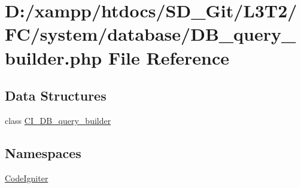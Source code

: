 \hypertarget{system_2database_2_d_b__query__builder_8php}{}\section{D\+:/xampp/htdocs/\+S\+D\+\_\+\+Git/\+L3\+T2/\+F\+C/system/database/\+D\+B\+\_\+query\+\_\+builder.php File Reference}
\label{system_2database_2_d_b__query__builder_8php}
\subsection*{Data Structures}
\begin{DoxyCompactItemize}
\item 
class \hyperlink{class_c_i___d_b__query__builder}{C\+I\+\_\+\+D\+B\+\_\+query\+\_\+builder}
\end{DoxyCompactItemize}
\subsection*{Namespaces}
\begin{DoxyCompactItemize}
\item 
 \hyperlink{namespace_code_igniter}{Code\+Igniter}
\end{DoxyCompactItemize}
